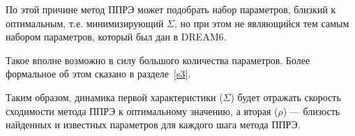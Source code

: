 По этой причине метод ППРЭ может подобрать набор параметров, близкий к 
оптимальным, т.е. минимизирующий $\Sigma$, но при этом не являющийся тем самым 
набором параметров, который был дан в DREAM6. 

Такое вполне возможно в силу большого количества параметров.
Более формальное об этом сказано в разделе~\ref{s3}.

Таким образом, динамика первой характеристики ($\Sigma$) будет отражать
скорость сходимости метода ППРЭ к оптимальному значению, а вторая ($\rho$)
— близость найденных и известных параметров для каждого шага метода ППРЭ. 

\clearpage
